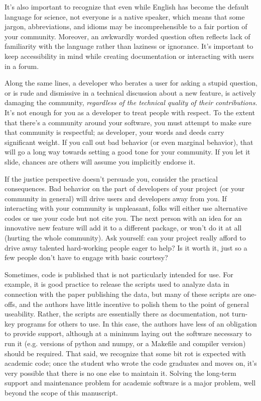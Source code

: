 \documentclass[9pt,training,ASAPversion]{livecoms}
\begin{document}
It's also important to recognize that even while English has become the default
language for science, not everyone is a native speaker, which means that some
jargon, abbreviations, and idioms may be incomprehensible to a fair portion of
your community. Moreover, an awkwardly worded question often reflects lack of
familiarity with the language rather than laziness or ignorance. It's important
to keep accessibility in mind while creating documentation or interacting with
users in a forum.

Along the same lines, a developer who berates a user for asking a stupid
question, or is rude and dismissive in a technical discussion about a new
feature, is actively damaging the community, \emph{regardless of the technical
quality of their contributions.} It's not enough for you as a developer to treat
people with respect.  To the extent that there's a community around your
software, you must attempt to make sure that community is respectful; as
developer, your words and deeds carry significant weight. If you call out bad
behavior (or even marginal behavior), that will go a long way towards setting a
good tone for your community. If you let it slide, chances are others will
assume you implicitly endorse it.

If the justice perspective doesn't persuade you, consider the practical
consequences. Bad behavior on the part of developers of your project (or your
community in general) will drive users and developers away from you. If
interacting with your community is unpleasant, folks will either use alternative
codes or use your code but not cite you. The next person with an idea for an
innovative new feature will add it to a different package, or won't do it at all
(hurting the whole community). Ask yourself: can your project really afford to
drive away talented hard-working people eager to help? Is it worth it, just so a
few people don't have to engage with basic courtesy?

Sometimes, code is published that is not particularly intended for use. For
example, it is good practice to release the scripts used to analyze data in
connection with the paper publishing the data, but many of these scripts are
one-offs, and the authors have little incentive to polish them to the point of
general useability. Rather, the scripts are essentially there as documentation,
not turn-key programs for others to use. In this case, the authors have less of
an obligation to provide support, although at a minimum laying out the software
necessary to run it (e.g. versions of python and numpy, or a Makefile and
compiler version) should be required.  That said, we recognize that some bit rot
is expected with academic code; once the student who wrote the code graduates
and moves on, it's very possible that there is no one else to maintain it.
Solving the long-term support and maintenance problem for academic software is a
major problem, well beyond the scope of this manuscript.
\end{document}
